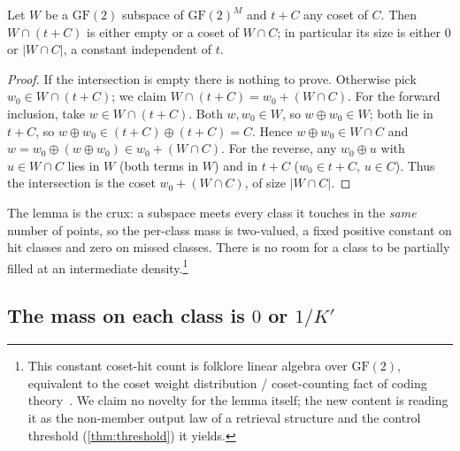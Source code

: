 \documentclass[sigconf,nonacm,anonymous,balance=false]{acmart}
\newcommand{\GF}{\mathrm{GF}(2)}
\newcommand{\W}{W}                          %
\newcommand{\inter}{\cap}
\begin{document}
\begin{lemma}
\label{lem:subspace-coset}
Let $\W$ be a $\GF$ subspace of $\GF^M$ and $t + C$ any coset of $C$. Then
$\W \inter (t + C)$ is either empty or a coset of $\W \inter C$; in particular its size
is either $0$ or $|\W \inter C|$, a constant independent of $t$.
\end{lemma}

\begin{proof}
If the intersection is empty there is nothing to prove. Otherwise pick
$w_0 \in \W \inter (t + C)$; we claim $\W \inter (t + C) = w_0 + (\W \inter C)$. For
the forward inclusion, take $w \in \W \inter (t + C)$. Both $w, w_0 \in \W$, so
$w \oplus w_0 \in \W$; both lie in $t + C$, so $w \oplus w_0 \in
(t+C) \oplus (t+C) = C$. Hence $w \oplus w_0 \in \W \inter C$ and
$w = w_0 \oplus (w \oplus w_0) \in w_0 + (\W \inter C)$. For the reverse, any
$w_0 \oplus u$ with $u \in \W \inter C$ lies in $\W$ (both terms in $\W$) and in
$t + C$ ($w_0 \in t+C$, $u \in C$). Thus the intersection is the coset
$w_0 + (\W \inter C)$, of size $|\W \inter C|$.
\end{proof}

The lemma is the crux: a subspace meets every class it touches in the \emph{same}
number of points, so the per-class mass is two-valued, a fixed positive constant on hit
classes and zero on missed classes. There is no room for a class to be partially filled
at an intermediate density.\footnote{This constant coset-hit count is folklore linear
algebra over $\GF$, equivalent to the coset weight distribution / coset-counting fact of
coding theory~\cite{macwilliams1977}. We claim no novelty for the lemma itself; the new
content is reading it as the non-member output law of a retrieval structure and the
control threshold (\cref{thm:threshold}) it yields.}

\subsection{\texorpdfstring{The mass on each class is $0$ or $1/K'$}{The mass on each class is 0 or 1/K'}}
\end{document}
